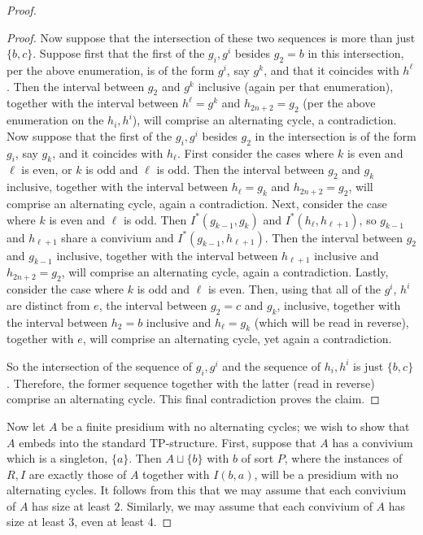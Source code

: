 \documentclass[10pt,a4paper]{amsart}
\begin{document}
\begin{proof}
\begin{proof}
Now suppose that the intersection of these two sequences is more than just $\{b, c\}$. Suppose first that the first of the $g_i, g^i$ besides $g_2=b$ in this intersection, per the above enumeration, is of the form $g^i$, say $g^k$, and that it coincides with $h^{\ell}$. Then the interval between $g_2$ and $g^k$ inclusive (again per that enumeration), together with the interval between $h^{\ell} = g^k$ and $h_{2n+2} = g_2$ (per the above enumeration on the $h_i, h^i$), will comprise an  alternating cycle, a contradiction. Now suppose that the first of the $g_i, g^i$ besides $g_2$ in the intersection is of the form $g_i$, say $g_k$, and it coincides with $h_\ell$. First consider the cases where $k$ is even and $\ell$ is even, or $k$ is odd and $\ell$ is odd. Then the interval between $g_2$ and $g_k$ inclusive, together with the interval between $h_{\ell} = g_k$ and $h_{2n+2} = g_2$, will comprise an alternating cycle, again a contradiction. Next, consider the case where $k$ is even and $\ell$ is odd. Then $I^{*}(g_{k-1}, g_{k})$ and $I^{*}(h_{\ell}, h_{\ell+1})$, so $g_{k-1}$ and $h_{\ell+1}$ share a convivium and $I^{*}(g_{k-1}, h_{\ell+1})$. Then the interval between $g_2$ and $g_{k-1}$ inclusive, together with the interval between $h_{\ell+1}$ inclusive and  $h_{2n+2} = g_2$, will comprise an alternating cycle, again a contradiction. Lastly, consider the case where $k$ is odd and $\ell$ is even. Then, using that all of the $g^i$, $h^i$ are distinct from $e$, the interval between $g_{2}=c$ and $g_{k}$, inclusive, together with the interval between $h_{2}=b$ inclusive and $h_{\ell} = g_{k}$ (which will be read in reverse), together with $e$, will comprise an alternating cycle, yet again a contradiction.

So the intersection of the sequence of $g_i, g^i$ and the sequence of $h_i, h^i$ is just $\{b, c\}$. Therefore, the former sequence together with the latter (read in reverse) comprise an alternating cycle. This final contradiction proves the claim.




\end{proof}
Now let $A$ be a finite presidium with no alternating cycles; we wish to show that $A$ embeds into the standard $\mathrm{TP}$-structure. First, suppose that $A$ has a convivium which is a singleton, $\{a\}$. Then $A \sqcup \{b\}$ with $b$ of sort $P$, where the instances of $R, I$ are exactly those of $A$ together with $I(b, a)$, will be a presidium with no alternating cycles. It follows from this that we may assume that each convivium of $A$ has size at least $2$. Similarly, we may assume that each convivium of $A$ has size at least $3$, even at least $4$.


\end{proof}
\end{document}
